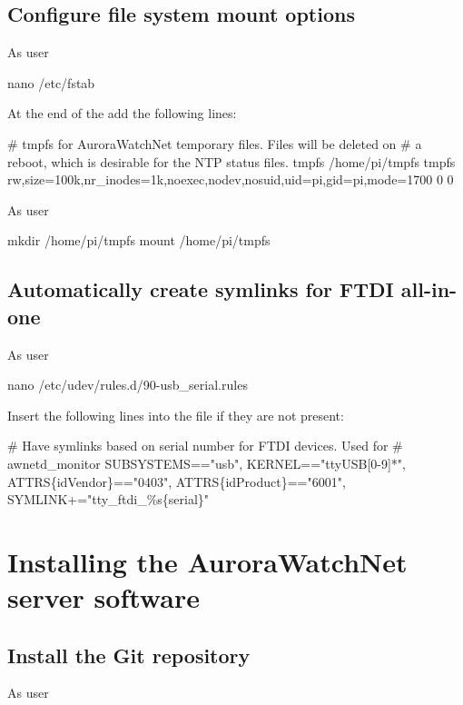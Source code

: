 \subsection{Configure file system mount options}

As user \rootUser
\begin{Cmd}
nano /etc/fstab  
\end{Cmd}

At the end of the  add the following lines:
\begin{Cmd}[fontsize=\relsize{-2.5}]
# tmpfs for AuroraWatchNet temporary files. Files will be deleted on 
# a reboot, which is desirable for the NTP status files.
tmpfs  /home/pi/tmpfs  tmpfs  rw,size=100k,nr_inodes=1k,noexec,nodev,nosuid,uid=pi,gid=pi,mode=1700  0  0
\end{Cmd}

As user \rootUser
\begin{Cmd}
mkdir /home/pi/tmpfs
mount /home/pi/tmpfs
\end{Cmd}

\subsection{Automatically create symlinks for FTDI all-in-one}

As user \rootUser
\begin{Cmd}
nano /etc/udev/rules.d/90-usb_serial.rules
\end{Cmd}

Insert the following lines into the file if they are not present:
\begin{Cmd}[fontsize=\relsize{-3}]
# Have symlinks based on serial number for FTDI devices. Used for 
# awnetd_monitor
SUBSYSTEMS=="usb", KERNEL=="ttyUSB[0-9]*", ATTRS\{idVendor\}=="0403", ATTRS\{idProduct\}=="6001", SYMLINK+="tty_ftdi_\%s\{serial\}"  
\end{Cmd}

\section{Installing the AuroraWatchNet server software}

\subsection{Install the Git repository}
As user \piUser



